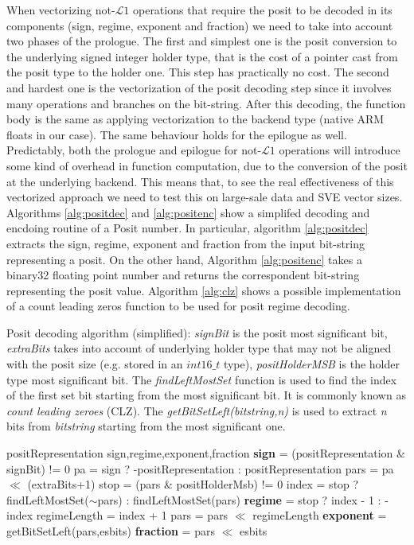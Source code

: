 When vectorizing not-$\mathcal{L}1$ operations that require the posit to be decoded in its components (sign, regime, exponent and fraction) we need to take into account two phases of the prologue. The first and simplest one is the posit conversion to the underlying signed integer holder type, that is the cost of a pointer cast from the posit type to the holder one. This step has practically no cost. The second and hardest one is the vectorization of the posit decoding step since it involves many operations and branches on the bit-string. After this decoding, the function body is the same as applying vectorization to the backend type (native ARM floats in our case).
The same behaviour holds for the epilogue as well.
Predictably, both the prologue and epilogue for not-$\mathcal{L}1$ operations will introduce some kind of overhead in function computation, due to the conversion of the posit at the underlying backend. This means that, to see the real effectiveness of this vectorized approach we need to test this on large-sale data and SVE vector sizes.
Algorithms \ref{alg:positdec} and \ref{alg:positenc} show a simplifed decoding and encdoing routine of a Posit number. In particular, algorithm \ref{alg:positdec} extracts the sign, regime, exponent and fraction from the input bit-string representing a posit. On the other hand, Algorithm \ref{alg:positenc} takes a binary32 floating point number and returns the correspondent bit-string representing the posit value. Algorithm \ref{alg:clz} shows a possible implementation of a count leading zeros function to be used for posit regime decoding.  


\begin{algorithm}
 \caption{Posit decoding algorithm (simplified): \textit{signBit} is the posit most significant bit, \textit{extraBits} takes into account of underlying holder type that may not be aligned with the posit size (e.g.  stored in an $int16\_t$ type), \textit{positHolderMSB} is the holder type most significant bit. The \textit{findLeftMostSet} function is used to find the index of the first set bit starting from the most significant bit. It is commonly known as \textit{count leading zeroes} (CLZ). The \textit{getBitSetLeft(bitstring,n)} is used to extract \textit{n} bits from \textit{bitstring} starting from the most significant one.}
 \label{alg:positdec}
 \begin{algorithmic}[1]
 \renewcommand{\algorithmicrequire}{\textbf{Input:}}
 \renewcommand{\algorithmicensure}{\textbf{Output:}}
 \Require positRepresentation
 \Ensure sign,regime,exponent,fraction
    \State \textbf{sign} = (positRepresentation \& signBit) != 0
    \State pa = sign ? -positRepresentation : positRepresentation
    \State pars = pa $\ll$ (extraBits+1)
    \State stop = (pars \& positHolderMsb) != 0
    \State index = stop ? findLeftMostSet($\sim$pars) : findLeftMostSet(pars)
    \State \textbf{regime} = stop ? index - 1 : -index
    \State regimeLength = index + 1
    \State pars = pars $\ll$ regimeLength
    \State \textbf{exponent} = getBitSetLeft(pars,esbits)
    \State \textbf{fraction} = pars $\ll$ esbits 
\end{algorithmic} 
\end{algorithm}


